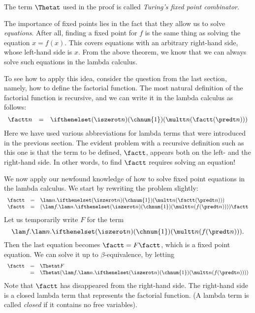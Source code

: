 \documentclass[12pt]{article}
\begin{document}
The term $\Thetat$ used in the proof is called {\em Turing's fixed point
  combinator}. 

The importance of fixed points lies in the fact that they allow us to
solve {\em equations}. After all, finding a fixed point for $f$ is the
same thing as solving the equation $x = f(x)$. This covers equations
with an arbitrary right-hand side, whose left-hand side is $x$. From
the above theorem, we know that we can always solve such equations in
the lambda calculus.

To see how to apply this idea, consider the question from the last
section, namely, how to define the factorial function. The most
natural definition of the factorial function is recursive, and we can
write it in the lambda calculus as follows:
\[ \begin{array}{rcl} 
  \factt n &=& \ifthenelset (\iszerot n) (\chnum{1}) (\multt n (\factt
  (\predt n)))
 \end{array}
 \]
Here we have used various abbreviations for lambda terms that were
introduced in the previous section. The evident problem with a
recursive definition such as this one is that the term to be defined,
$\factt$, appears both on the left- and the right-hand side. In other
words, to find $\factt$ requires solving an equation!

We now apply our newfound knowledge of how to solve fixed point equations
in the lambda calculus. We start by rewriting the problem slightly:
\[ \begin{array}{rcl} 
  \factt &=& \lam n.\ifthenelset (\iszerot n) (\chnum{1}) (\multt n (\factt
  (\predt n))) \\
  \factt &=& (\lam f.\lam n.\ifthenelset (\iszerot n) (\chnum{1})
  (\multt n (f (\predt n)))) \factt
\end{array}
\]
Let us temporarily write $F$ for the term 
\[ \lam f.\lam n.\ifthenelset (\iszerot n) (\chnum{1}) (\multt n (f
   (\predt n))). 
\]
Then the last equation becomes $\factt = F \factt$, which is a
fixed point equation. We can solve it up to $\beta$-equivalence, by
letting
\[ \begin{array}{rcl} 
  \factt &=& \Thetat F \\
  &=& \Thetat (\lam f.\lam n.\ifthenelset (\iszerot n) (\chnum{1})
  (\multt n (f (\predt n))))
\end{array}
\]
Note that $\factt$ has disappeared from the right-hand side. The
right-hand side is a closed lambda term that represents the factorial
function. (A lambda term is called {\em closed} if it contains no free
variables).
\end{document}
